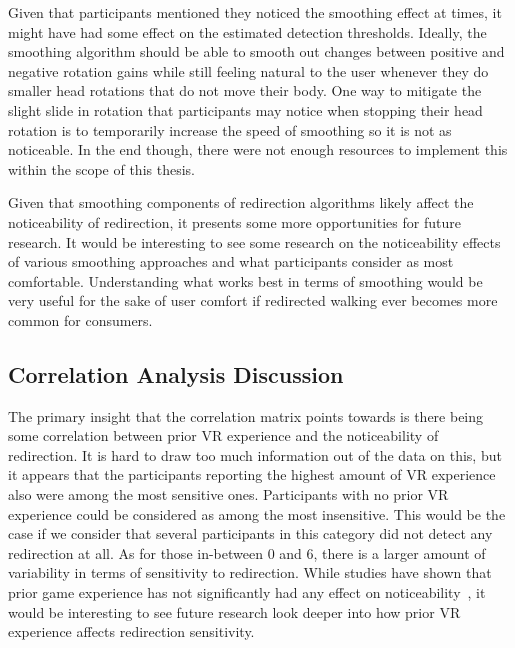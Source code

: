 Given that participants mentioned they noticed the smoothing effect at times, it might have had some effect on the estimated detection thresholds. Ideally, the smoothing algorithm should be able to smooth out changes between positive and negative rotation gains while still feeling natural to the user whenever they do smaller head rotations that do not move their body. One way to mitigate the slight slide in rotation that participants may notice when stopping their head rotation is to temporarily increase the speed of smoothing so it is not as noticeable. In the end though, there were not enough resources to implement this within the scope of this thesis. 

Given that smoothing components of redirection algorithms likely affect the noticeability of redirection, it presents some more opportunities for future research. It would be interesting to see some research on the noticeability effects of various smoothing approaches and what participants consider as most comfortable. Understanding what works best in terms of smoothing would be very useful for the sake of user comfort if redirected walking ever becomes more common for consumers. 

\subsection{Correlation Analysis Discussion}
The primary insight that the correlation matrix points towards is there being some correlation between prior VR experience and the noticeability of redirection. It is hard to draw too much information out of the data on this, but it appears that the participants reporting the highest amount of VR experience also were among the most sensitive ones. Participants with no prior VR experience could be considered as among the most insensitive. This would be the case if we consider that several participants in this category did not detect any redirection at all. As for those in-between 0 and 6, there is a larger amount of variability in terms of sensitivity to redirection. While studies have shown that prior game experience has not significantly had any effect on noticeability~\cite{nguyen2018individual}, it would be interesting to see future research look deeper into how prior VR experience affects redirection sensitivity.
